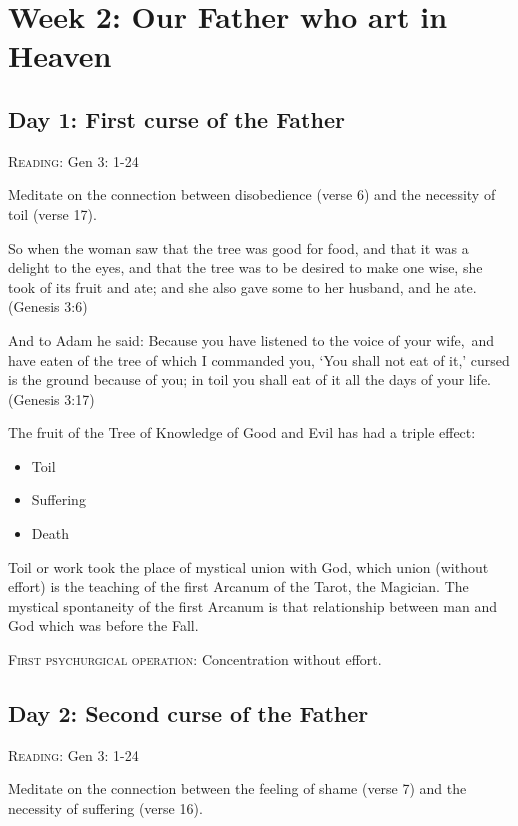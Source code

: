 \chapter{Week 2: Our Father who art in Heaven}

\section{Day 1: First curse of the Father}

\textsc{Reading}: Gen 3: 1-24

Meditate on the connection between disobedience (verse 6) and the necessity of toil (verse 17).

So when the woman saw that the tree was good for food, and that it was a delight to the eyes, and that the tree was to be desired to make one wise, she took of its fruit and ate; and she also gave some to her husband, and he ate. (Genesis 3:6)

And to Adam he said: Because you have listened to the voice of your wife, and have eaten of the tree of which I commanded you, `You shall not eat of it,' cursed is the ground because of you; in toil you shall eat of it all the days of your life. (Genesis 3:17)

\begin{quotationx}
The fruit of the Tree of Knowledge of Good and Evil has had a triple effect:

\begin{itemize}
\item Toil 
\item Suffering 
\item Death 
\end{itemize}

Toil or work took the place of mystical union with God, which union (without effort) is the teaching of the first Arcanum of the Tarot, the Magician. The mystical spontaneity of the first Arcanum is that relationship between man and God which was before the Fall. 

\end{quotationx}
\textsc{First psychurgical operation}: Concentration without effort.

\section{Day 2: Second curse of the Father}
\textsc{Reading}: Gen 3: 1-24

Meditate on the connection between the feeling of shame (verse 7) and the necessity of suffering (verse 16).

